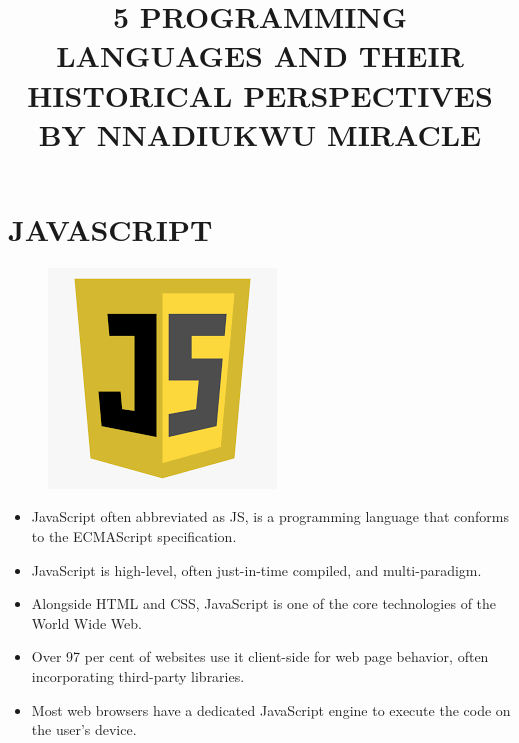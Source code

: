 \documentclass{article}
\title{5 PROGRAMMING LANGUAGES AND THEIR HISTORICAL PERSPECTIVES BY NNADIUKWU MIRACLE}
\begin{document}
	\maketitle
	\newpage
	\pagecolor{black!2}
		\color{black}
	\centering
	
	\section*{JAVASCRIPT}
	
	\begin{figure}
		\begin{center}
			\pagecolor{black!3}
			\color{black}
			\includegraphics[width=0.3\linewidth]{js.png}
			\end{center}
	\end{figure}
	\begin{itemize}
		\item JavaScript often abbreviated as JS, is a programming language that conforms to the ECMAScript specification.
		\item JavaScript is high-level, often just-in-time compiled, and multi-paradigm. 
		\item Alongside HTML and CSS, JavaScript is one of the core technologies of the World Wide Web. 
		\item Over 97 per cent of websites use it client-side for web page behavior, often incorporating third-party libraries. 
		\item Most web browsers have a dedicated JavaScript engine to execute the code on the user's device.
			\end{itemize}
			\newpage
				\pagecolor{black}
			\color{white}
\end{document}
